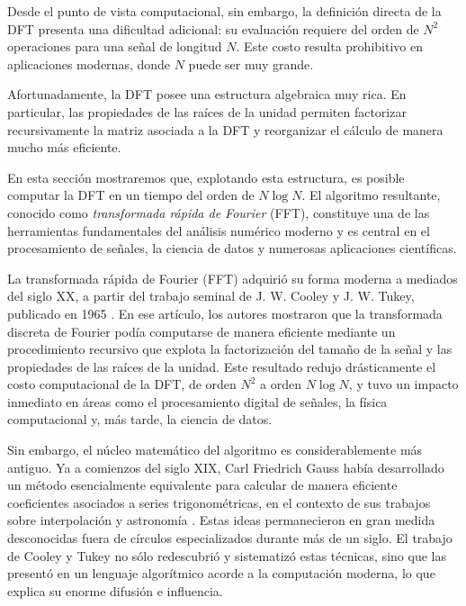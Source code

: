 \documentclass[12pt, a4paper]{amsbook}
\theoremstyle{remark}
\theoremstyle{definition}
\numberwithin{section}{chapter}
\numberwithin{subsection}{section}
\numberwithin{equation}{section}
\numberwithin{figure}{chapter}
\begin{document}
Desde el punto de vista computacional, sin embargo, la definición directa de la DFT presenta una dificultad adicional: su evaluación requiere del orden de $N^2$ operaciones para una señal de longitud $N$. Este costo resulta prohibitivo en aplicaciones modernas, donde $N$ puede ser muy grande.

Afortunadamente, la DFT posee una estructura algebraica muy rica. En particular, las propiedades de las raíces de la unidad permiten factorizar recursivamente la matriz asociada a la DFT y reorganizar el cálculo de manera mucho más eficiente.

En esta sección mostraremos que, explotando esta estructura, es posible computar la DFT en un tiempo del orden de $N \log N$. El algoritmo resultante, conocido como \emph{transformada rápida de Fourier} (FFT), constituye una de las herramientas fundamentales del análisis numérico moderno y es central en el procesamiento de señales, la ciencia de datos y numerosas aplicaciones científicas.

La transformada rápida de Fourier (FFT) adquirió su forma moderna a mediados del siglo XX, a partir del trabajo seminal de J. W. Cooley y J. W. Tukey, publicado en 1965 \cite{CooleyTukey}. En ese artículo, los autores mostraron que la transformada discreta de Fourier podía computarse de manera eficiente mediante un procedimiento recursivo que explota la factorización del tamaño de la señal y las propiedades de las raíces de la unidad. Este resultado redujo drásticamente el costo computacional de la DFT, de orden $N^2$ a orden $N \log N$, y tuvo un impacto inmediato en áreas como el procesamiento digital de señales, la física computacional y, más tarde, la ciencia de datos.

Sin embargo, el núcleo matemático del algoritmo es considerablemente más antiguo. Ya a comienzos del siglo XIX, Carl Friedrich Gauss había desarrollado un método esencialmente equivalente para calcular de manera eficiente coeficientes asociados a series trigonométricas, en el contexto de sus trabajos sobre interpolación y astronomía \cite{Gauss1805, Heideman}. Estas ideas permanecieron en gran medida desconocidas fuera de círculos especializados durante más de un siglo. El trabajo de Cooley y Tukey no sólo redescubrió y sistematizó estas técnicas, sino que las presentó en un lenguaje algorítmico acorde a la computación moderna, lo que explica su enorme difusión e influencia.
\end{document}
